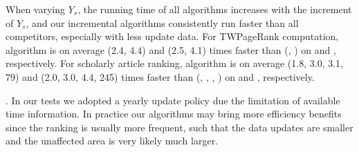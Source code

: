 When varying $Y_s$, the running time of all algorithms increases with the increment of $Y_s$, and our incremental algorithms
consistently run faster than all competitors, especially with less update data.
%
For TWPageRank computation, algorithm \inctwprscc is on average (2.4, 4.4) and (2.5, 4.1) times faster than (\twprscc, \powtwprscc) on \aminer and \magdata, respectively.
%
For scholarly article ranking, algorithm \incensemble is on average (1.8, 3.0, 3.1, 79) and (2.0, 3.0, 4.4, 245) times faster than (\batensemble, \powensemble, \futurerank, \hhgrank) on \aminer and \magdata, respectively.

.
In our tests we adopted a yearly update policy due the limitation of  available time information. In practice our algorithms may bring more efficiency benefits since the ranking is usually more frequent, such that the data updates are smaller and the unaffected area is very likely much larger.



